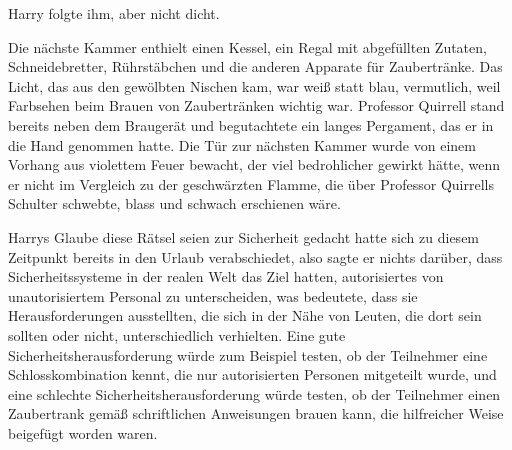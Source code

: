 Harry folgte ihm, aber nicht dicht.

\later

Die nächste Kammer enthielt einen Kessel, ein Regal mit abgefüllten Zutaten, Schneidebretter, Rührstäbchen und die anderen Apparate für Zaubertränke. Das Licht, das aus den gewölbten Nischen kam, war weiß statt blau, vermutlich, weil Farbsehen beim Brauen von Zaubertränken wichtig war. Professor Quirrell stand bereits neben dem Braugerät und begutachtete ein langes Pergament, das er in die Hand genommen hatte. Die Tür zur nächsten Kammer wurde von einem Vorhang aus violettem Feuer bewacht, der viel bedrohlicher gewirkt hätte, wenn er nicht im Vergleich zu der geschwärzten Flamme, die über Professor Quirrells Schulter schwebte, blass und schwach erschienen wäre.

Harrys Glaube diese Rätsel seien zur Sicherheit gedacht hatte sich zu diesem Zeitpunkt bereits in den Urlaub verabschiedet, also sagte er nichts darüber, dass Sicherheitssysteme in der realen Welt das Ziel hatten, autorisiertes von unautorisiertem Personal zu unterscheiden, was bedeutete, dass sie Herausforderungen ausstellten, die sich in der Nähe von Leuten, die dort sein sollten oder nicht, unterschiedlich verhielten. Eine gute Sicherheitsherausforderung würde zum Beispiel testen, ob der Teilnehmer eine Schlosskombination kennt, die nur autorisierten Personen mitgeteilt wurde, und eine schlechte Sicherheitsherausforderung würde testen, ob der Teilnehmer einen Zaubertrank gemäß schriftlichen Anweisungen brauen kann, die hilfreicher Weise beigefügt worden waren.

